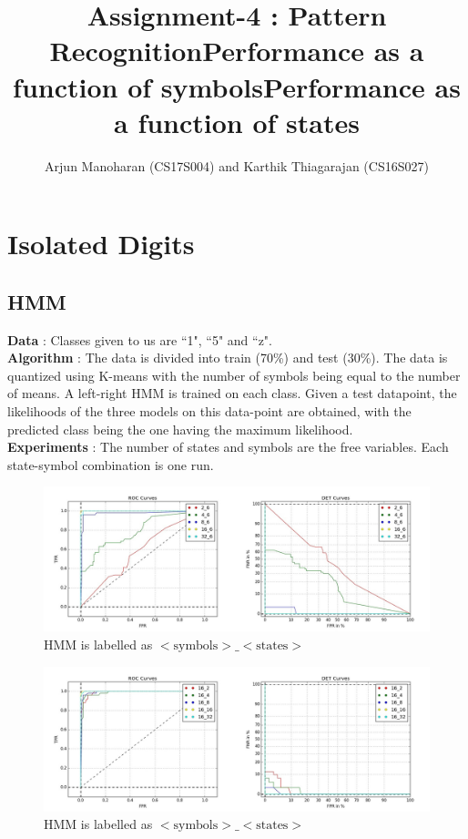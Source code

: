 \documentclass{article}
\title{Assignment-4 : Pattern Recognition}
\author{Arjun Manoharan (CS17S004) and Karthik Thiagarajan (CS16S027)}
\begin{document}
\maketitle

\tableofcontents

\newpage
\section{Isolated Digits}
\subsection{HMM}
\textbf{Data} : Classes given to us are ``1", ``5" and ``z".\\
\textbf{Algorithm} : The data is divided into train (70\%) and test (30\%). The data is quantized using K-means with the number of symbols being equal to the number of means. A left-right HMM is trained on each class. Given a test datapoint, the likelihoods of the three models on this data-point are obtained, with the predicted class being the one having the maximum likelihood.\\
\textbf{Experiments} : The number of states and symbols are the free variables. Each state-symbol combination is one run.

\begin{figure}[h!]
\centering
\title{Performance as a function of symbols}
\includegraphics[width=\textwidth]{isolated_digits/plots/hmm/roc_det_symbols.jpg}
\caption{HMM is labelled as $<\text{symbols}>\_<\text{states}>$}
\end{figure}

\begin{figure}[h!]
\centering
\title{Performance as a function of states}
\includegraphics[width=\textwidth]{isolated_digits/plots/hmm/roc_det_states.jpg}
\caption{HMM is labelled as $<\text{symbols}>\_<\text{states}>$}
\end{figure}
\end{document}
